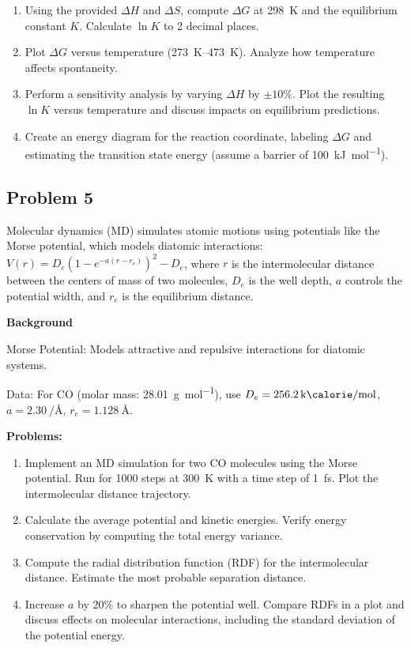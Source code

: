 \documentclass[12pt]{article}
\begin{document}
\begin{enumerate}
\item Using the provided $\Delta H$ and $\Delta S$, compute $\Delta G$ at \SI{298}{\kelvin} and the equilibrium constant $K$. Calculate $\ln K$ to 2 decimal places.

\item Plot $\Delta G$ versus temperature (\SIrange{273}{473}{\kelvin}). Analyze how temperature affects spontaneity.

\item Perform a sensitivity analysis by varying $\Delta H$ by $\pm 10\%$. Plot the resulting $\ln K$ versus temperature and discuss impacts on equilibrium predictions.

\item Create an energy diagram for the reaction coordinate, labeling $\Delta G$ and estimating the transition state energy (assume a barrier of \SI{100}{\kilo\joule\per\mole}).
\end{enumerate}

\newpage
\subsection{Problem 5}

Molecular dynamics (MD) simulates atomic motions using potentials like the Morse potential, which models diatomic interactions: $V(r) = D_e \left(1 - e^{-a(r - r_e)}\right)^2 - D_e$, where $r$ is the intermolecular distance between the centers of mass of two molecules, $D_e$ is the well depth, $a$ controls the potential width, and $r_e$ is the equilibrium distance.

\textbf{Background}

Morse Potential: Models attractive and repulsive interactions for diatomic systems.

Data: For CO (molar mass: \SI{28.01}{\gram\per\mole}), use $D_e = \SI{256.2}{\kilo\calorie\per\mole}$, $a = \SI{2.30}{\per\angstrom}$, $r_e = \SI{1.128}{\angstrom}$.

\textbf{Problems:}

\begin{enumerate}
\item Implement an MD simulation for two CO molecules using the Morse potential. Run for 1000 steps at \SI{300}{\kelvin} with a time step of \SI{1}{\femto\second}. Plot the intermolecular distance trajectory.

\item Calculate the average potential and kinetic energies. Verify energy conservation by computing the total energy variance.

\item Compute the radial distribution function (RDF) for the intermolecular distance. Estimate the most probable separation distance.

\item Increase $a$ by 20\% to sharpen the potential well. Compare RDFs in a plot and discuss effects on molecular interactions, including the standard deviation of the potential energy.
\end{enumerate}
\end{document}
